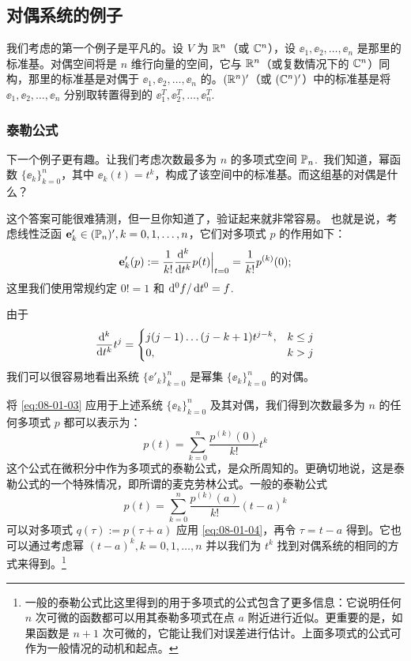 \subsection{对偶系统的例子}\label{sec:08-01-04}
我们考虑的第一个例子是平凡的。设 $V$ 为 $\mathbb{R}^n$（或 $\mathbb{C}^n$），设 $\ee_1, \ee_2, \dots, \ee_n$ 是那里的标准基。对偶空间将是 $n$ 维行向量的空间，它与 $\mathbb{R}^n$（或复数情况下的 $\mathbb{C}^n$）同构，那里的标准基是对偶于 $\ee_1, \ee_2, \dots, \ee_n$ 的。$( \mathbb{R}^n )'$（或 $(\mathbb{C}^n)'$）中的标准基是将 $\ee_1, \ee_2, \dots, \ee_n$ 分别取转置得到的 $\ee^T_1, \ee^T_2, \dots, \ee^T_n$.~

\subsubsection{泰勒公式}\label{sec:08-01-04-01}
下一个例子更有趣。让我们考虑次数最多为 $n$ 的多项式空间 $\mathbb{P}_n$.~我们知道，幂函数 $\{\ee_k\}_{k=0}^n$，其中 $\ee_k(t)=t^k$，构成了该空间中的标准基。而这组基的对偶是什么？

这个答案可能很难猜测，但一旦你知道了，验证起来就非常容易。
也就是说，考虑线性泛函 $\mathbf{e}'_k \in (\mathbb{P}_n)', k = 0, 1, \dots, n$，它们对多项式 $p$ 的作用如下：
$$ \mathbf{e}'_k(p) := \frac{1}{k!} \frac{\mathop{}\!\mathrm{d} ^k}{\mathop{}\!\mathrm{d} t^k} p(t) \Big|_{t=0} = \frac{1}{k!} p^{(k)}(0); $$
这里我们使用常规约定 $0! = 1$ 和 $\mathop{}\!\mathrm{d} ^0 f / \mathop{}\!\mathrm{d} t^0 = f$.~

由于
$$ \frac{\mathop{}\!\mathrm{d} ^k}{\mathop{}\!\mathrm{d} t^k} t^j = \begin{cases} j(j-1)\dots(j-k+1)t^{j-k}, & k \le j \\ 0, & k > j \end{cases} $$
我们可以很容易地看出系统 $\{\ee'_k\}_{k=0}^n$ 是幂集 $\{\ee_k\}_{k=0}^n$ 的对偶。

将 \eqref{eq:08-01-03} 应用于上述系统 $\{\ee_k\}_{k=0}^n$ 及其对偶，我们得到次数最多为 $n$ 的任何多项式 $p$ 都可以表示为：
\begin{equation}\label{eq:08-01-04}
p(t) = \sum_{k=0}^n \frac{p^{(k)}(0)}{k!} t^k
\end{equation}
这个公式在微积分中作为多项式的泰勒公式，是众所周知的。更确切地说，这是泰勒公式的一个特殊情况，即所谓的麦克劳林公式。一般的泰勒公式
$$p(t) = \sum_{k=0}^n \frac{p^{(k)}(a)}{k!} (t-a)^k$$
可以对多项式 $q(\tau):=p(\tau+a)$ 应用 \eqref{eq:08-01-04}，再令 $\tau=t-a$ 得到。它也可以通过考虑幂 $(t-a)^k, k=0, 1, \dots, n$ 并以我们为 $t^k$ 找到对偶系统的相同的方式来得到。\footnote{一般的泰勒公式比这里得到的用于多项式的公式包含了更多信息：它说明任何 $n$ 次可微的函数都可以用其泰勒多项式在点 $a$ 附近进行近似。更重要的是，如果函数是 $n+1$ 次可微的，它能让我们对误差进行估计。上面多项式的公式可作为一般情况的动机和起点。}

